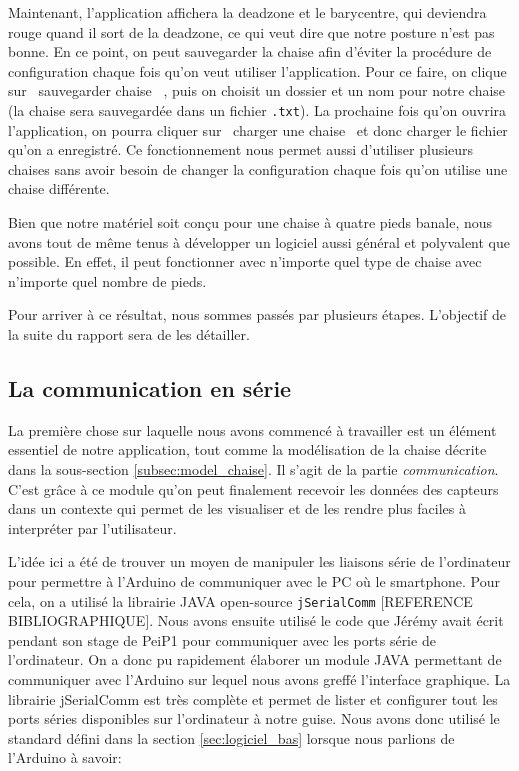 \documentclass{polytech/polytech}
\begin{document}
Maintenant, l'application affichera la deadzone et le barycentre, qui deviendra rouge quand il sort de la deadzone, ce qui veut dire que notre posture n'est pas bonne.
 En ce point, on peut sauvegarder la chaise afin d'éviter la procédure de configuration chaque fois qu'on veut utiliser l'application. 
Pour ce faire, on clique sur \guillemotleft\ sauvegarder chaise \guillemotright\ , puis on choisit un dossier et un nom pour notre chaise (la chaise sera sauvegardée dans un fichier \texttt{.txt}). 
La prochaine fois qu'on ouvrira l'application, on pourra cliquer sur \guillemotleft\ charger une chaise \guillemotright\  et donc charger le fichier qu'on a enregistré.
 Ce fonctionnement nous permet aussi d'utiliser plusieurs chaises sans avoir besoin de changer la configuration chaque fois qu'on utilise une chaise différente.

Bien que notre matériel soit conçu pour une chaise à quatre pieds banale, nous avons tout de même tenus à développer un logiciel aussi général et polyvalent que possible.
En effet, il peut fonctionner avec n'importe quel type de chaise avec n'importe quel nombre de pieds.

Pour arriver à ce résultat, nous sommes passés par plusieurs étapes. L'objectif de la suite du rapport sera de les détailler.

\subsection{La communication en série}
\label{subsec:comm_serie}
La première chose sur laquelle nous avons commencé à travailler est un élément essentiel de notre application, tout comme la modélisation de la chaise décrite dans la sous-section \ref{subsec:model_chaise}. Il s'agit de la partie \textit{communication}. C'est grâce à ce module qu'on peut finalement recevoir les données des capteurs dans un contexte qui permet de les visualiser et de les rendre plus faciles à interpréter par l'utilisateur.

L'idée ici a été de trouver un moyen de manipuler les liaisons série de l'ordinateur pour permettre à l'Arduino de communiquer avec le PC où le smartphone.
Pour cela, on a utilisé la librairie JAVA open-source \texttt{jSerialComm} [REFERENCE BIBLIOGRAPHIQUE]. Nous avons ensuite utilisé le code que Jérémy avait écrit pendant son stage de PeiP1 pour communiquer avec les ports série de l'ordinateur. On a donc pu rapidement élaborer un module JAVA permettant de communiquer avec l'Arduino sur lequel nous avons greffé l'interface graphique. La librairie jSerialComm est très complète et permet de lister et configurer tout les ports séries disponibles sur l'ordinateur à notre guise. Nous avons donc utilisé le standard défini dans la section \ref{sec:logiciel_bas} lorsque nous parlions de l'Arduino à savoir:
\end{document}
